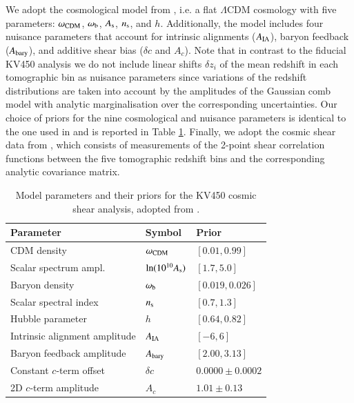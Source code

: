 \documentclass{aa}
\begin{document}
We adopt the cosmological model from \cite{hildebrandt18}, i.e. a flat $\Lambda$CDM cosmology with five parameters: $\omega_{\rm CDM}$, $\omega_{\rm b}$, $A_{\rm s}$, $n_{\rm s}$, and $h$. Additionally, the model includes four nuisance parameters that account for intrinsic alignments ($A_{\rm IA}$), baryon feedback ($A_{\rm bary}$), and additive shear bias ($\delta c$ and $A_c$). Note that in contrast to the fiducial KV450 analysis we do not include linear shifts $\delta z_i$ of the mean redshift in each tomographic bin as nuisance parameters since variations of the redshift distributions are taken into account by the amplitudes of the Gaussian comb model with analytic marginalisation over the corresponding uncertainties. Our choice of priors for the nine cosmological and nuisance parameters is identical to the one used in \cite{hildebrandt18} and is reported in Table \ref{tab:priors}. Finally, we adopt the cosmic shear data from \cite{hildebrandt18}, which consists of measurements of the 2-point shear correlation functions between the five tomographic redshift bins and the corresponding analytic covariance matrix.
\begin{table}
\caption{Model parameters and their priors for the KV450 cosmic shear analysis, adopted from \cite{hildebrandt18}.}
\begin{tabular}{lll}
\hline
Parameter & Symbol & Prior\\
\hline
CDM density & $\omega_{\rm CDM}$ & $[0.01, 0.99]$\\
Scalar spectrum ampl. & $\ln(10^{10}A_{\rm s})$ & $[1.7, 5.0]$\\
Baryon density & $\omega_{\rm b}$ & $[0.019, 0.026]$ \\
Scalar spectral index & $n_{\rm s}$ & $[0.7, 1.3]$ \\
Hubble parameter & $h$ & $[0.64, 0.82]$ \\
\hline
Intrinsic alignment amplitude & $A_{\rm IA}$ & $[-6, 6]$\\
Baryon feedback amplitude & $A_{\rm bary}$ & $[2.00, 3.13]$\\
Constant $c$-term offset & $\delta c$ & $0.0000\pm0.0002$ \\
2D $c$-term amplitude & $A_c$ & $1.01\pm0.13$\\
\hline
\end{tabular}
\label{tab:priors}
\end{table}
\end{document}
